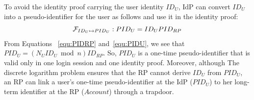 To avoid the identity proof carrying the user identity $ID_U$, IdP can convert $ID_U$ into a pseudo-identifier for the user as follows and use it in the identity proof:
\begin{equation}
\setlength{\abovedisplayskip}{3pt}
\setlength{\belowdisplayskip}{3pt}
 \mathcal{F}_{ID_{U} \mapsto PID_{U}}: PID_U = {ID_U}{PID_{RP}}
 \label{equ:PIDU}
\end{equation}
From Equations%
~\ref{equ:PIDRP} and~\ref{equ:PIDU}, we see that $PID_U = ({N_UID_U} \bmod n){ID_{RP}}$. So, $PID_U$ is a one-time pseudo-identifier that is valid only in one login session and one identity proof.
Moreover, although The discrete logarithm problem ensures that the RP cannot derive $ID_U$ from $PID_U$, 
an RP can  link a user's one-time pseudo-identifier at the IdP ($PID_U$) to her long-term identifier at the RP ($Account$) through a trapdoor.



